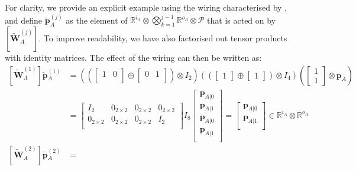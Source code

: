 \documentclass[10pt, a4paper]{article}
\numberwithin{equation}{section} %
\theoremstyle{definition}
\theoremstyle{plain}
\newcommand{\?}{\mathrel{?}} %
\newcommand{\R}{\mathbb{R}} %
\newcommand{\cvec}[1]{\boldsymbol{\mathbf{#1}}}    %
\newcommand{\matrp}[2]{\left[\mathbf{#1}#2\right]} %
\newcommand{\sP}{\mathcal{P}}
\begin{document}
      For clarity, we provide an explicit example using the wiring characterised by , and define \(\cvec{\tilde{p}}_A^{(j)}\) as the element of \(\R^{i_A} \otimes \bigotimes_{k=1}^{j-1} \R^{o_A} \otimes \sP\) that is acted on by \(\matrp{\tilde{W}}{_A^{(j)}}\). To improve readability, we have also factorised out tensor products with identity matrices. The effect of the wiring can then be written as:
      \begin{align}
        \matrp{\tilde{W}}{_A^{(1)}} \cvec{\tilde{p}}{_A^{(1)}} &= \left( \left(
          \begin{bmatrix} 1 & 0 \\ \end{bmatrix} 
          \oplus \begin{bmatrix} 0 & 1 \\ \end{bmatrix} \right) \otimes I_2 \right)
          \left( \left( \begin{bmatrix} 1 \end{bmatrix} \oplus \begin{bmatrix} 1 \end{bmatrix} \right) \otimes I_{4} \right) 
          \left( \begin{bmatrix} 1 \\ 1 \end{bmatrix} \otimes \cvec{p}_A \right) \\
                                                               &= \begin{bmatrix}
          I_2 & 0_{2\times 2} & 0_{2\times 2} & 0_{2\times 2} \\
          0_{2\times 2} & 0_{2\times 2} & 0_{2\times 2} & I_2 \\
          \end{bmatrix} I_{8} \begin{bmatrix}
          \cvec{p}_{A|0} \\
          \cvec{p}_{A|1} \\
          \cvec{p}_{A|0} \\
          \cvec{p}_{A|1} \\
          \end{bmatrix} = \begin{bmatrix}
          \cvec{p}_{A|0} \\
          \cvec{p}_{A|1} \\
          \end{bmatrix} \in \R^{i_A} \otimes \R^{o_A} \\
        \matrp{\tilde{W}}{_A^{(2)}} \cvec{\tilde{p}}{_A^{(2)}} &= \begin{gathered}

\end{gathered}
\end{align}
\end{document}
